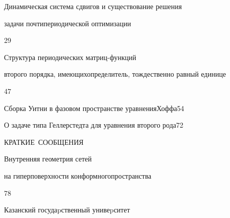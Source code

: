{Динамическая система сдвигов и существование решения


задачи почти\newline периодической оптимизации}{29}




{Структура периодических матриц-функций


второго порядка, имеющих\newline определитель, тождественно равный единице}{47}




{Сборка Уитни в фазовом пространстве уравнения\newline Хоффа}{54}






{О задаче типа Геллерстедта для уравнения второго рода}{72}


\bigskip





\centerline{КРАТКИЕ~СООБЩЕНИЯ}


\medskip







{Внутренняя геометрия сетей 


на гиперповерхности конформного\newline пространства}{78}








\vfill


\noindent\raisebox{2pt}{\copyright} Казанский госудаpственный унивеpситет





